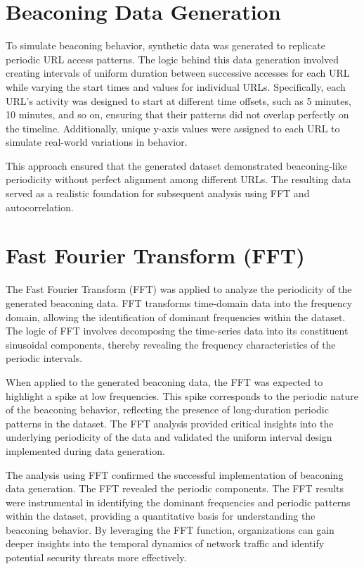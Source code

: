 \section{Beaconing Data Generation}
To simulate beaconing behavior, synthetic data was generated to replicate periodic URL access patterns. The logic behind this data generation involved creating intervals of uniform duration between successive accesses for each URL while varying the start times and values for individual URLs. Specifically, each URL's activity was designed to start at different time offsets, such as 5 minutes, 10 minutes, and so on, ensuring that their patterns did not overlap perfectly on the timeline. Additionally, unique y-axis values were assigned to each URL to simulate real-world variations in behavior.

This approach ensured that the generated dataset demonstrated beaconing-like periodicity without perfect alignment among different URLs. The resulting data served as a realistic foundation for subsequent analysis using FFT and autocorrelation.

\section{Fast Fourier Transform (FFT)}
The Fast Fourier Transform (FFT) was applied to analyze the periodicity of the generated beaconing data. FFT transforms time-domain data into the frequency domain, allowing the identification of dominant frequencies within the dataset. The logic of FFT involves decomposing the time-series data into its constituent sinusoidal components, thereby revealing the frequency characteristics of the periodic intervals.

When applied to the generated beaconing data, the FFT was expected to highlight a spike at low frequencies. This spike corresponds to the periodic nature of the beaconing behavior, reflecting the presence of long-duration periodic patterns in the dataset. The FFT analysis provided critical insights into the underlying periodicity of the data and validated the uniform interval design implemented during data generation.

The analysis using FFT confirmed the successful implementation of beaconing data generation. The FFT revealed the periodic components. The FFT results were instrumental in identifying the dominant frequencies and periodic patterns within the dataset, providing a quantitative basis for understanding the beaconing behavior. By leveraging the FFT function, organizations can gain deeper insights into the temporal dynamics of network traffic and identify potential security threats more effectively.

